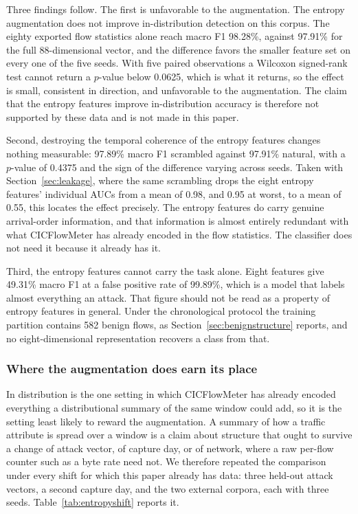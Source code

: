 \documentclass{ieeeaccess}
\begin{document}
Three findings follow. The first is unfavorable to the augmentation. The entropy
augmentation does not improve in-distribution detection on this corpus. The
eighty exported flow statistics alone reach macro F1 98.28\%, against 97.91\%
for the full 88-dimensional vector, and the difference favors the smaller
feature set on every one of the five seeds. With five paired observations a
Wilcoxon signed-rank test cannot return a $p$-value below 0.0625, which is what
it returns, so the effect is small, consistent in direction, and unfavorable to the
augmentation. The claim that the entropy features improve in-distribution
accuracy is therefore not supported by these data and is not made in this
paper.

Second, destroying the temporal coherence of the entropy features changes
nothing measurable: 97.89\% macro F1 scrambled against 97.91\% natural, with a
$p$-value of 0.4375 and the sign of the difference varying across seeds. Taken
with Section~\ref{sec:leakage}, where the same scrambling drops the eight entropy
features' individual AUCs from a mean of 0.98, and 0.95 at worst, to a mean of
0.55, this locates the effect precisely. The entropy features do carry genuine arrival-order information, and
that information is almost entirely redundant with what CICFlowMeter has already
encoded in the flow statistics. The classifier does not need it because it
already has it.

Third, the entropy features cannot carry the task alone. Eight features give
49.31\% macro F1 at a false positive rate of 99.89\%, which is a model that
labels almost everything an attack. That figure should not be read as a property
of entropy features in general. Under the chronological protocol the training
partition contains 582 benign flows, as Section~\ref{sec:benignstructure}
reports, and no eight-dimensional representation recovers a class from that.

\subsubsection{Where the augmentation does earn its place}
\label{sec:entropyshift}
In distribution is the one setting in which CICFlowMeter has already encoded
everything a distributional summary of the same window could add, so it is the
setting least likely to reward the augmentation. A summary of how a traffic
attribute is spread over a window is a claim about structure that ought to
survive a change of attack vector, of capture day, or of network, where a raw
per-flow counter such as a byte rate need not. We therefore repeated the
comparison under every shift for which this paper already has data: three
held-out attack vectors, a second capture day, and the two external corpora,
each with three seeds. Table~\ref{tab:entropyshift} reports it.
\end{document}
